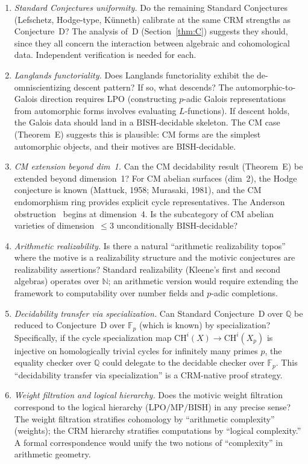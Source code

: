 \documentclass[11pt]{article}
\theoremstyle{definition}
\theoremstyle{remark}
\newcommand{\N}{\mathbb{N}}
\newcommand{\Q}{\mathbb{Q}}
\newcommand{\Fp}{\mathbb{F}_p}
\newcommand{\LPO}{\mathrm{LPO}}
\newcommand{\MP}{\mathrm{MP}}
\newcommand{\BISH}{\mathrm{BISH}}
\newcommand{\CRM}{\mathrm{CRM}}
\begin{document}
\begin{enumerate}
\item \emph{Standard Conjectures uniformity.} Do the remaining Standard Conjectures (Lefschetz, Hodge-type, K\"unneth) calibrate at the same $\CRM$ strengths as Conjecture~D? The analysis of~D (Section~\ref{thm:C}) suggests they should, since they all concern the interaction between algebraic and cohomological data. Independent verification is needed for each.

\item \emph{Langlands functoriality.} Does Langlands functoriality exhibit the de-omniscientizing descent pattern? If so, what descends? The automorphic-to-Galois direction requires $\LPO$ (constructing $p$-adic Galois representations from automorphic forms involves evaluating $L$-functions). If descent holds, the Galois data should land in a $\BISH$-decidable skeleton. The CM case (Theorem~E) suggests this is plausible: CM forms are the simplest automorphic objects, and their motives are $\BISH$-decidable.

\item \emph{CM extension beyond dim~1.} Can the CM decidability result (Theorem~E) be extended beyond dimension~1? For CM abelian surfaces (dim~2), the Hodge conjecture is known (Mattuck, 1958; Murasaki, 1981), and the CM endomorphism ring provides explicit cycle representatives. The Anderson obstruction~\cite{Anderson1993} begins at dimension~4. Is the subcategory of CM abelian varieties of dimension~$\leq 3$ unconditionally $\BISH$-decidable?

\item \emph{Arithmetic realizability.} Is there a natural ``arithmetic realizability topos'' where the motive is a realizability structure and the motivic conjectures are realizability assertions? Standard realizability (Kleene's first and second algebras) operates over $\N$; an arithmetic version would require extending the framework to computability over number fields and $p$-adic completions.

\item \emph{Decidability transfer via specialization.} Can Standard Conjecture~D over $\Q$ be reduced to Conjecture~D over $\Fp$ (which is known) by specialization? Specifically, if the cycle specialization map $\mathrm{CH}^i(X) \to \mathrm{CH}^i(X_p)$ is injective on homologically trivial cycles for infinitely many primes $p$, the equality checker over $\Q$ could delegate to the decidable checker over $\Fp$. This ``decidability transfer via specialization'' is a $\CRM$-native proof strategy.

\item \emph{Weight filtration and logical hierarchy.} Does the motivic weight filtration correspond to the logical hierarchy ($\LPO / \MP / \BISH$) in any precise sense? The weight filtration stratifies cohomology by ``arithmetic complexity'' (weights); the $\CRM$ hierarchy stratifies computations by ``logical complexity.'' A formal correspondence would unify the two notions of ``complexity'' in arithmetic geometry.
\end{enumerate}
\end{document}
